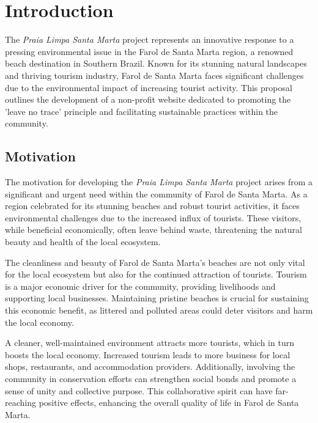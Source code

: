 \chapter{Introduction}
\label{ch:intro}

 The \textit{Praia Limpa Santa Marta} project represents an innovative response to a pressing environmental issue in the Farol de Santa Marta region, a renowned beach destination in Southern Brazil. Known for its stunning natural landscapes and thriving tourism industry, Farol de Santa Marta faces significant challenges due to the environmental impact of increasing tourist activity. This proposal outlines the development of a non-profit website dedicated to promoting the 'leave no trace' principle and facilitating sustainable practices within the community.


\section{Motivation}

The motivation for developing the \textit{Praia Limpa Santa Marta} project arises from a significant and urgent need within the community of Farol de Santa Marta. As a region celebrated for its stunning beaches and robust tourist activities, it faces environmental challenges due to the increased influx of tourists. These visitors, while beneficial economically, often leave behind waste, threatening the natural beauty and health of the local ecosystem.
    
    The cleanliness and beauty of Farol de Santa Marta's beaches are not only vital for the local ecosystem but also for the continued attraction of tourists. Tourism is a major economic driver for the community, providing livelihoods and supporting local businesses. Maintaining pristine beaches is crucial for sustaining this economic benefit, as littered and polluted areas could deter visitors and harm the local economy.
    
    A cleaner, well-maintained environment attracts more tourists, which in turn boosts the local economy. Increased tourism leads to more business for local shops, restaurants, and accommodation providers. Additionally, involving the community in conservation efforts can strengthen social bonds and promote a sense of unity and collective purpose. This collaborative spirit can have far-reaching positive effects, enhancing the overall quality of life in Farol de Santa Marta.
    
